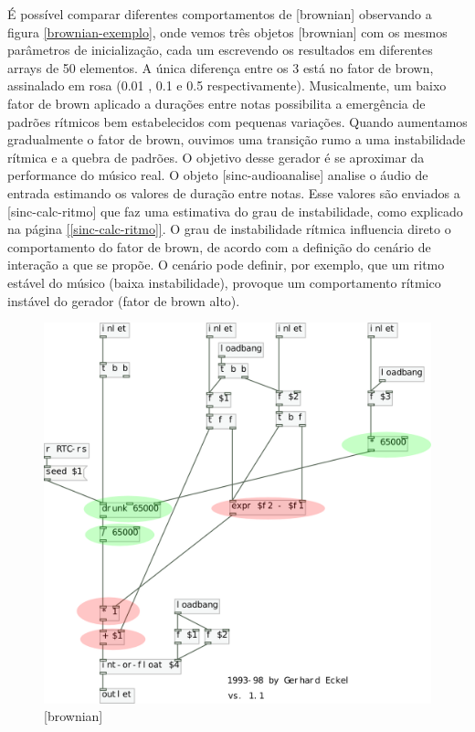\documentclass{ppgmus}
\begin{document}
É possível comparar diferentes comportamentos de [brownian] observando
a figura \ref{brownian-exemplo}, onde vemos três objetos [brownian] com
os mesmos parâmetros de inicialização, cada um escrevendo os resultados
em diferentes arrays de 50 elementos. A única diferença entre os 3 está 
no fator de brown, assinalado em rosa (0.01 , 0.1 e 0.5 respectivamente).
Musicalmente, um baixo fator de brown aplicado a durações entre notas
possibilita a emergência de padrões rítmicos bem estabelecidos com 
pequenas variações. Quando aumentamos gradualmente o fator de brown, ouvimos
uma transição rumo a uma instabilidade rítmica e a quebra de padrões. 
O objetivo desse gerador é se aproximar da performance do músico real.
O objeto [sinc-audioanalise] analise o áudio de entrada estimando os valores de duração entre notas.
Esse valores são enviados a [sinc-calc-ritmo] que faz uma estimativa do grau
de instabilidade, como explicado na página \ref{[sinc-calc-ritmo]}.
O grau de instabilidade rítmica influencia direto o comportamento do fator de brown, de acordo
com a definição do cenário de interação a que se propõe. O cenário pode definir, por exemplo, que
um ritmo estável do músico (baixa instabilidade), provoque um comportamento rítmico instável
do gerador (fator de brown alto).



 \begin{figure}
\includegraphics[scale=.6]{brownian}
\caption{[brownian]}
\label{brownian}
\end{figure} 
\end{document}
